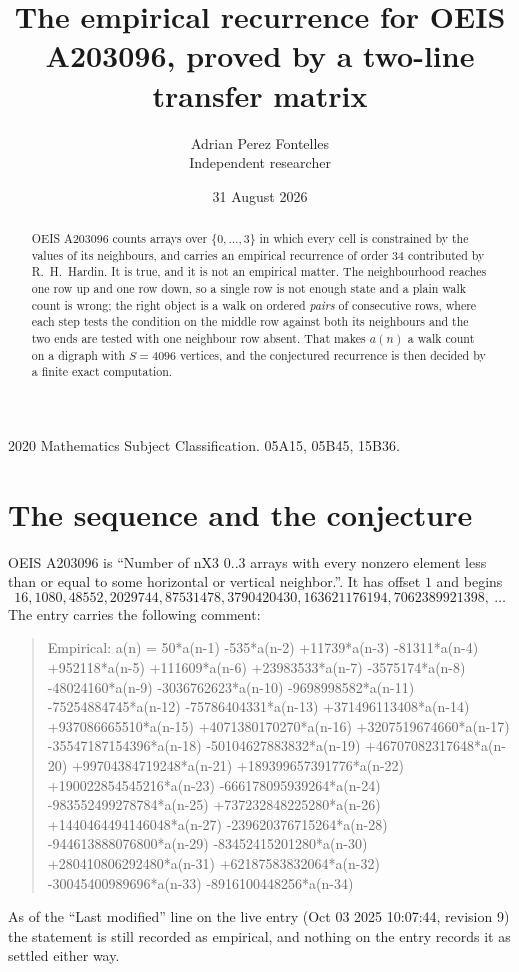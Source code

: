 \documentclass[11pt,a4paper]{article}
\title{The empirical recurrence for OEIS A203096, proved by a two-line transfer matrix}
\author{Adrian Perez Fontelles\\ \small Independent researcher}
\date{31 August 2026}
\theoremstyle{plain}
\theoremstyle{definition}
\begin{document}
\maketitle

\begin{abstract}
OEIS A203096 counts arrays over $\{0,\dots,3\}$ in which every cell is constrained by the
values of its neighbours, and carries an empirical recurrence of order $34$ contributed
by R.~H.~Hardin. It is true, and it is not an empirical matter. The neighbourhood reaches one
row up and one row down, so a single row is not enough state and a plain walk count
is wrong; the right object is a walk on ordered \emph{pairs} of consecutive rows, where
each step tests the condition on the middle row against both its neighbours and the two
ends are tested with one neighbour row absent. That makes $a(n)$ a walk count on a digraph
with $S=4096$ vertices, and the conjectured recurrence is then decided by a finite exact
computation.
\end{abstract}

\noindent\small 2020 Mathematics Subject Classification. 05A15, 05B45, 15B36.\normalsize

\section{The sequence and the conjecture}

OEIS A203096 is ``Number of nX3 0..3 arrays with every nonzero element less than or equal to some horizontal or vertical neighbor.''. It has offset $1$ and begins
\[
16, 1080, 48552, 2029744, 87531478, 3790420430, 163621176194, 7062389921398,\ \dots
\]
The entry carries the following comment:
\begin{quote}\small
Empirical: a(n) = 50*a(n-1) -535*a(n-2) +11739*a(n-3) -81311*a(n-4) +952118*a(n-5) +111609*a(n-6) +23983533*a(n-7) -3575174*a(n-8) -48024160*a(n-9) -3036762623*a(n-10) -9698998582*a(n-11) -75254884745*a(n-12) -75786404331*a(n-13) +371496113408*a(n-14) +937086665510*a(n-15) +4071380170270*a(n-16) +3207519674660*a(n-17) -35547187154396*a(n-18) -50104627883832*a(n-19) +46707082317648*a(n-20) +99704384719248*a(n-21) +189399657391776*a(n-22) +190022854545216*a(n-23) -666178095939264*a(n-24) -983552499278784*a(n-25) +737232848225280*a(n-26) +1440464494146048*a(n-27) -239620376715264*a(n-28) -944613888076800*a(n-29) -83452415201280*a(n-30) +280410806292480*a(n-31) +62187583832064*a(n-32) -30045400989696*a(n-33) -8916100448256*a(n-34)
\end{quote}
As of the ``Last modified'' line on the live entry (Oct 03 2025 10:07:44, revision 9) the statement is
still recorded as empirical, and nothing on the entry records it as settled either way.
\end{document}
